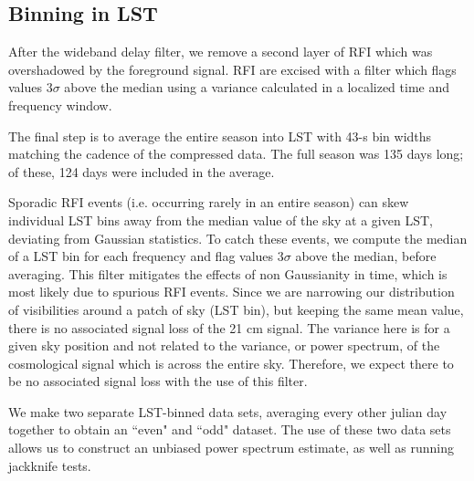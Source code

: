 \documentclass[twocolumn,numberedappendix]{emulateapj} \shorttitle{New Limits on the 21 cm Power Spectrum at $z=8.4$}
\begin{document}
\subsection{Binning in LST}\label{sec:lstbin}

After the wideband delay filter, we remove a second layer of RFI 
 which was overshadowed by the foreground signal. RFI are excised with a filter
which flags values $3\sigma$ above the median using a variance calculated in a
localized time and frequency window.  


The final step is to average the entire season into LST
with 43-s bin widths matching the cadence of
the compressed data. The full season was 135 days long; of these, 124
days were included in the average. 

Sporadic RFI events (i.e. occurring rarely in an entire season) can skew
individual LST bins away from the median value of the sky at a given LST,
deviating from Gaussian statistics. To catch these events, we compute the median
of a LST bin for each frequency and flag values 3$\sigma$ above the median,
before averaging. This filter mitigates the effects of non Gaussianity in time,
which is most likely due to spurious RFI events. Since we are narrowing our
distribution of visibilities around a patch of sky (LST bin), but keeping the
same mean value, there is no associated signal loss of the 21 cm signal. The
variance here is for a given sky position and not related to the variance, or
power spectrum, of the cosmological signal which is across the entire sky.
Therefore, we expect there to be no associated signal loss with the use of this
filter.

We make two separate LST-binned data sets, averaging every other julian day
together to obtain an ``even" and ``odd" dataset. The use of these two data sets
allows us to construct an unbiased power spectrum estimate, as well as running
jackknife tests. 
\end{document}
